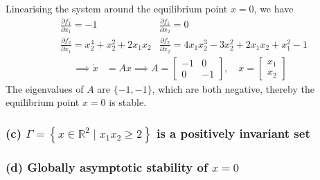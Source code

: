 Linearising the system around the equilibrium point \( x = 0 \), we have
\begin{align*}
     &
    \frac{\partial f_1}{\partial x_1}
    =
    -1
     &
    \frac{\partial f_1}{\partial x_2}
    =
    0
    \\ &
    \frac{\partial f_2}{\partial x_1}
    =
    x_2^4 + x_2^2 + 2 x_1 x_2
     &
    \frac{\partial f_2}{\partial x_2}
    =
    4 x_1 x_2^3 - 3 x_2^2 + 2 x_1 x_2 + x_1^2 - 1
\end{align*}
\begin{align*}
    \implies
    \dot{x}
     & =
    A x
    \implies
    A
    =
    \begin{bmatrix}
        -1 & 0  \\
        0  & -1
    \end{bmatrix},
    \quad
    x
    =
    \begin{bmatrix}
        x_1 \\
        x_2
    \end{bmatrix}
\end{align*}
The eigenvalues of \( A \) are \( \{ -1, -1 \} \), which are both negative, thereby the equilibrium point \( x = 0 \) is stable.

\subsubsection*{(c) \( \Gamma=\left \{ x \in \mathbb{R}^{2} \mid x_{1} x_{2} \geq 2\right \} \) is a positively invariant set}

\subsubsection*{(d) Globally asymptotic stability of \( x=0 \)}
